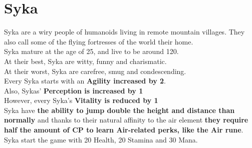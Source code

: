 \section{Syka}
Syka are a wiry people of humanoids living in remote mountain villages. They also call some of the flying fortresses of the world their home.\\
Syka mature at the age of 25, and live to be around 120.\\
At their best, Syka are witty, funny and charismatic.\\
At their worst, Syka are carefree, smug and condescending.\\
Every Syka starts with an \textbf{Agility increased by 2}.\\
Also, Sykas' \textbf{Perception is increased by 1}\\
However, every Syka's \textbf{Vitality is reduced by 1}\\
Syka have \textbf{the ability to jump double the height and distance than normally} and thanks to their natural affinity to the air element \textbf{they require half the amount of CP to learn Air-related perks, like the Air rune}.\\
Syka start the game with 20 Health, 20 Stamina and 30 Mana.\\